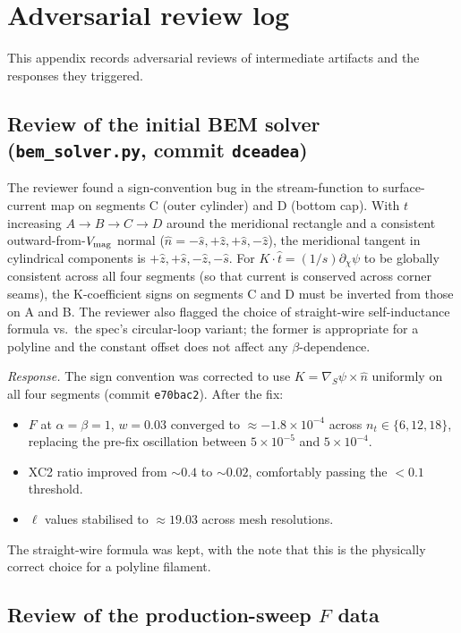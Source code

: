 \documentclass[11pt]{article}
\begin{document}
\appendix

\section{Adversarial review log}
\label{app:review}

This appendix records adversarial reviews of intermediate artifacts and
the responses they triggered.

\subsection*{Review of the initial BEM solver (\texttt{bem\_solver.py}, commit \texttt{dceadea})}

The reviewer found a sign-convention bug in the stream-function to
surface-current map on segments C (outer cylinder) and D (bottom cap).
With $t$ increasing $A\!\to\!B\!\to\!C\!\to\!D$ around the meridional
rectangle and a consistent outward-from-$V_{\rm mag}$ normal
($\hat n = -\hat s, +\hat z, +\hat s, -\hat z$), the meridional tangent
in cylindrical components is $+\hat z, +\hat s, -\hat z, -\hat s$.  For
$K\cdot\hat t=(1/s)\partial_\chi\psi$ to be globally consistent across
all four segments (so that current is conserved across corner seams),
the K-coefficient signs on segments C and D must be inverted from those
on A and B.  The reviewer also flagged the choice of straight-wire
self-inductance formula vs.\ the spec's circular-loop variant; the
former is appropriate for a polyline and the constant offset does not
affect any $\beta$-dependence.

\emph{Response.}  The sign convention was corrected to use
$K=\nabla_S\psi\times\hat n$ uniformly on all four segments
(commit \texttt{e70bac2}).  After the fix:
\begin{itemize}
\item $F$ at $\alpha=\beta=1$, $w=0.03$ converged to $\approx-1.8\times
10^{-4}$ across $n_t\in\{6,12,18\}$, replacing the pre-fix oscillation
between $5\times 10^{-5}$ and $5\times 10^{-4}$.
\item XC2 ratio improved from $\sim 0.4$ to $\sim 0.02$, comfortably
passing the $<0.1$ threshold.
\item $\ell$ values stabilised to $\approx 19.03$ across mesh
resolutions.
\end{itemize}
The straight-wire formula was kept, with the note that this is the
physically correct choice for a polyline filament.

\subsection*{Review of the production-sweep $F$ data}
\end{document}

